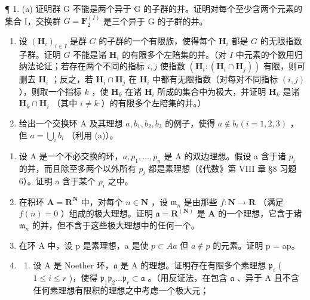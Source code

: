 
¶ 1. (a) 证明群 G 不能是两个异于 G 的子群的并。证明对每个至少含两个元素的集合 I，交换群 \(G = \mathbf{F}_{2}^{(I)}\) 是三个异于 G 的子群的并。

\begin{enumerate}
\def\labelenumi{(\alph{enumi})}
\setcounter{enumi}{1}
\item
  设 \((\mathbf{H}_i)_{i\in I}\) 是群 \(G\) 的子群的一个有限族，使得每个 \(\mathbf{H}_i\) 都是 \(G\) 的无限指数子群。证明 \(G\) 不能是诸 \(\mathbf{H}_i\) 的有限多个左陪集的并。（对 \(I\) 中元素的个数用归纳法论证；若存在两个不同的指标 \(i,j\) 使指数 \((\mathbf{H}_i:(\mathbf{H}_i\cap \mathbf{H}_j))\) 有限，则可删去 \(\mathbf{H}_i\) ；反之，若 \(\mathbf{H}_i\cap \mathbf{H}_j\) 在 \(\mathbf{H}_i\) 中都有无限指数（对每对不同指标 \((i,j)\) ），则取一个指标 \(k\) ，使 \(\mathbf{H}_k\) 在诸 \(\mathbf{H}_i\) 所成的集合中为极大，并证明 \(\mathbf{H}_k\) 是诸 \(\mathbf{H}_k\cap \mathbf{H}_i\) （其中 \(i\neq k\) ）的有限多个左陪集的并。）
\item
  给出一个交换环 A 及其理想 \(a, b_{1}, b_{2}, b_{3}\) 的例子，使得 \(a \notin b_{i} (i = 1, 2, 3)\) ，但 \(a = \bigcup_{i} b_{i}\) （利用 (a)）。
\end{enumerate}

\begin{enumerate}
\def\labelenumi{\arabic{enumi}.}
\setcounter{enumi}{1}
\item
  设 A 是一个不必交换的环，\(a, p_{1}, \ldots, p_{n}\) 是 A 的双边理想。假设 a 含于诸 \(p_{i}\) 的并，而且除至多两个以外所有 \(p_{i}\) 都是素理想（《代数》第 VIII 章 §8 习题 6）。证明 a 含于某个 \(p_{i}\) 之中。
\item
  在积环 \(\mathbf{A} = \mathbf{R}^{\mathbf{N}}\) 中，对每个 \(n \in \mathbf{N}\) ，设 \(\mathfrak{m}_n\) 是由那些 \(f\colon \mathbf{N} \to \mathbf{R}\) （满足 \(f(n) = 0\) ）组成的极大理想。证明 \(\mathfrak{a} = \mathbf{R}^{(\mathbf{N})}\) 是 \(\mathbf{A}\) 的一个理想，它含于诸 \(\mathfrak{m}_n\) 的并，但不含于这些极大理想中的任何一个。
\item
  在环 A 中，设 p 是素理想，a 是使 \(p \subset Aa\) 但 \(a \notin p\) 的元素。证明 p = ap。
\item
  \begin{enumerate}
  \def\labelenumii{(\alph{enumii})}
  \tightlist
  \item
    设 A 是 Noether 环，\(\mathfrak{a}\) 是 A 的理想。证明存在有限多个素理想 \(\mathfrak{p}_i\) ( \(1 \leqslant i \leqslant r\) )，使得 \(\mathfrak{p}_1\mathfrak{p}_2 \ldots \mathfrak{p}_r \subset \mathfrak{a}\) 。（用反证法，在包含 \(\mathfrak{a}\) 、异于 A 且不含任何素理想有限积的理想之中考虑一个极大元；
  \end{enumerate}
\end{enumerate}

